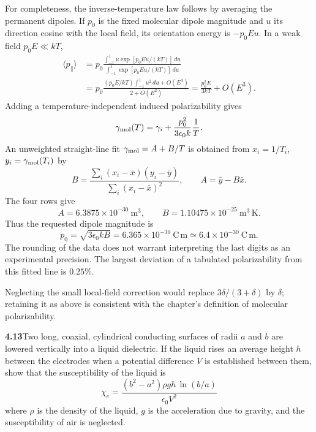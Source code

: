For completeness, the inverse-temperature law follows by averaging the
permanent dipoles. If $p_0$ is the fixed molecular dipole magnitude and
$u$ its direction cosine with the local field, its orientation energy
is $-p_0Eu$. In a weak field $p_0E\ll kT$,
\begin{align*}
\langle p_\parallel\rangle
&=p_0\frac{\int_{-1}^1u\exp[p_0Eu/(kT)]\,du}
{\int_{-1}^1\exp[p_0Eu/(kT)]\,du}\\
&=p_0\frac{(p_0E/kT)\int_{-1}^1u^2\,du+O(E^3)}
{2+O(E^2)}
=\frac{p_0^2E}{3kT}+O(E^3).
\end{align*}
Adding a temperature-independent induced polarizability gives
\[
\gamma_{\rm mol}(T)=\gamma_i+\frac{p_0^2}{3\epsilon_0k}\frac1T.
\]
An unweighted straight-line fit $\gamma_{\rm mol}=A+B/T$ is obtained from
$x_i=1/T_i$, $y_i=\gamma_{\rm mol}(T_i)$ by
\[
B=\frac{\sum_i(x_i-\bar x)(y_i-\bar y)}{\sum_i(x_i-\bar x)^2},
\qquad A=\bar y-B\bar x.
\]
The four rows give
\[
A=6.3875\times10^{-30}\ \mathrm m^3,\qquad
B=1.10475\times10^{-25}\ \mathrm{m^3\,K}.
\]
Thus the requested dipole magnitude is
\[
\boxed{p_0=\sqrt{3\epsilon_0kB}=6.365\times10^{-30}\ \mathrm{C\,m}
\simeq6.4\times10^{-30}\ \mathrm{C\,m}.}
\]
The rounding of the data does not warrant interpreting the last digits
as an experimental precision. The largest deviation of a tabulated
polarizability from this fitted line is $0.25\%$.
\begin{center}
\end{center}
Neglecting the small local-field correction would replace
$3\delta/(3+\delta)$ by $\delta$; retaining it as above is consistent
with the chapter's definition of molecular polarizability.

\par\bigskip
\noindent\textbf{4.13}\quad Two long, coaxial, cylindrical conducting surfaces of radii $a$ and $b$ are lowered vertically into a liquid dielectric. If the liquid rises an average height $h$ between the electrodes when a potential difference $V$ is established between them, show that the susceptibility of the liquid is
\[
\chi_{e}=\frac{(b^{2}-a^{2})\rho gh\,\ln(b/a)}{\epsilon_{0}V^{2}}
\]
where $\rho$ is the density of the liquid, $g$ is the acceleration due to gravity, and the susceptibility of air is neglected.
\solution

